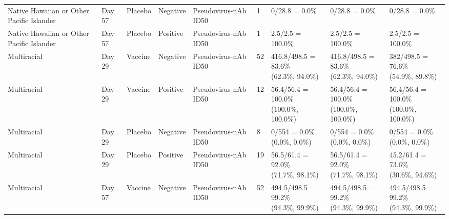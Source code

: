 \documentclass[]{book}
\theoremstyle{definition}
\theoremstyle{definition}
\theoremstyle{definition}
\newcommand{\1}{\mathbbm{1}}
\begin{document}
\begin{landscape}
\begin{ThreePartTable}
\begin{longtable}[t]{>{\raggedright\arraybackslash}p{2.7cm}llllllll}
\hspace{1em}Native Hawaiian or Other Pacific Islander & Day 57 & Placebo & Negative & Pseudovirus-nAb ID50 & 1 & 0/28.8 = 0.0\% & 0/28.8 = 0.0\% & 0/28.8 = 0.0\%\\
\hspace{1em}Native Hawaiian or Other Pacific Islander & Day 57 & Placebo & Positive & Pseudovirus-nAb ID50 & 1 & 2.5/2.5 = 100.0\% & 2.5/2.5 = 100.0\% & 2.5/2.5 = 100.0\%\\
\hspace{1em}Multiracial & Day 29 & Vaccine & Negative & Pseudovirus-nAb ID50 & 52 & \makecell[l]{416.8/498.5 = 83.6\%\\(62.3\%, 94.0\%)} & \makecell[l]{416.8/498.5 = 83.6\%\\(62.3\%, 94.0\%)} & \makecell[l]{382/498.5 = 76.6\%\\(54.9\%, 89.8\%)}\\
\hspace{1em}Multiracial & Day 29 & Vaccine & Positive & Pseudovirus-nAb ID50 & 12 & \makecell[l]{56.4/56.4 = 100.0\%\\(100.0\%, 100.0\%)} & \makecell[l]{56.4/56.4 = 100.0\%\\(100.0\%, 100.0\%)} & \makecell[l]{56.4/56.4 = 100.0\%\\(100.0\%, 100.0\%)}\\
\hspace{1em}Multiracial & Day 29 & Placebo & Negative & Pseudovirus-nAb ID50 & 8 & \makecell[l]{0/554 = 0.0\%\\(0.0\%, 0.0\%)} & \makecell[l]{0/554 = 0.0\%\\(0.0\%, 0.0\%)} & \makecell[l]{0/554 = 0.0\%\\(0.0\%, 0.0\%)}\\
\hspace{1em}Multiracial & Day 29 & Placebo & Positive & Pseudovirus-nAb ID50 & 19 & \makecell[l]{56.5/61.4 = 92.0\%\\(71.7\%, 98.1\%)} & \makecell[l]{56.5/61.4 = 92.0\%\\(71.7\%, 98.1\%)} & \makecell[l]{45.2/61.4 = 73.6\%\\(30.6\%, 94.6\%)}\\
\hspace{1em}Multiracial & Day 57 & Vaccine & Negative & Pseudovirus-nAb ID50 & 52 & \makecell[l]{494.5/498.5 = 99.2\%\\(94.3\%, 99.9\%)} & \makecell[l]{494.5/498.5 = 99.2\%\\(94.3\%, 99.9\%)} & \makecell[l]{494.5/498.5 = 99.2\%\\(94.3\%, 99.9\%)}\\

\end{longtable}
\end{ThreePartTable}
\end{landscape}
\end{document}
